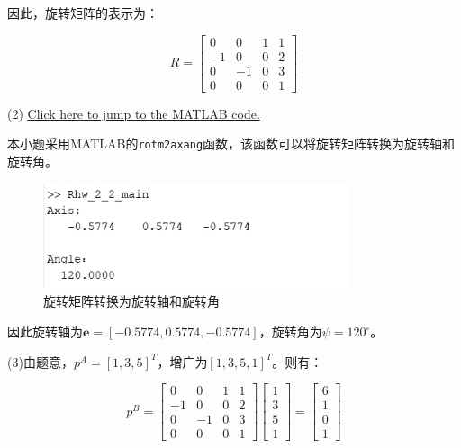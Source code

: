 \documentclass{ctexart}
\begin{document}
因此，旋转矩阵的表示为：

\begin{equation}
	R = \begin{bmatrix}
		0 & 0 & 1 & 1 \\
		-1 & 0 & 0 & 2 \\
		0 & -1 & 0 & 3 \\
		0 & 0 & 0 & 1
	\end{bmatrix}
\end{equation}

(2) \href{src/Rhw_2_2_main.m}{Click here to jump to the MATLAB code.}\par

本小题采用MATLAB的\verb|rotm2axang|函数，该函数可以将旋转矩阵转换为旋转轴和旋转角。

\begin{figure}[h]
	\centering
	\includegraphics[width=0.8\textwidth]{Image/2_2.png}
	\caption{旋转矩阵转换为旋转轴和旋转角}
\end{figure}

因此旋转轴为$\mathbf{e} =[-0.5774,0.5774,-0.5774]$，旋转角为$\psi =120^\circ$。

(3)由题意，$p^A=[1,3,5]^T$，增广为$[1,3,5,1]^T$。则有：

\begin{equation}
	p^B = \begin{bmatrix}
		0 & 0 & 1 & 1 \\
		-1 & 0 & 0 & 2 \\
		0 & -1 & 0 & 3 \\
		0 & 0 & 0 & 1
	\end{bmatrix}\begin{bmatrix}
		1 \\
		3 \\
		5 \\
		1
	\end{bmatrix} = \begin{bmatrix}
		6 \\
		1 \\
		0 \\
		1
	\end{bmatrix}
\end{equation}
\end{document}
